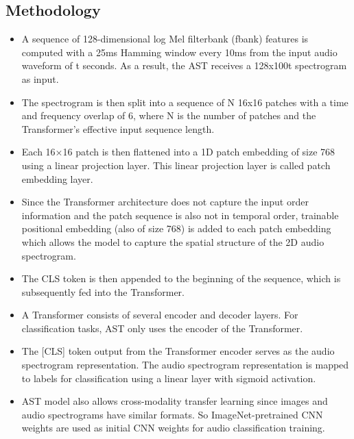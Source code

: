\subsection{Methodology}
\begin{itemize}
\item A sequence of 128-dimensional log Mel filterbank (fbank) features is computed with a 25ms Hamming window every 10ms from the input audio waveform of t seconds. As a result, the AST receives a 128x100t spectrogram as input.
\item The spectrogram is then split into a sequence of N 16x16 patches with a time and frequency overlap of 6, where N is the number of patches and the Transformer's effective input sequence length.
\item Each 16×16 patch is then flattened into a 1D patch embedding of size 768 using a linear projection layer. This linear projection layer is called patch embedding layer.
\item Since the Transformer architecture does not capture the input order information and the patch sequence is also not in temporal order, trainable positional embedding (also of size 768) is added to each patch embedding which allows the model to capture the spatial structure of the 2D audio spectrogram.
\item The CLS token is then appended to the beginning of the sequence, which is subsequently fed into the Transformer.
\item A Transformer consists of several encoder and decoder layers. For classification tasks, AST only uses the encoder of the Transformer.
\item The [CLS] token output from the Transformer encoder serves as the audio spectrogram representation. The audio spectrogram representation is mapped to labels for classification using a linear layer with sigmoid activation.
\item AST model also allows cross-modality transfer learning since images and audio spectrograms have similar formats. So ImageNet-pretrained CNN weights are used as initial CNN weights for audio classification training.
\end{itemize}

